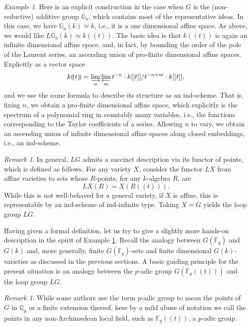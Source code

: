 \documentclass[10pt]{amsart}
\newcommand{\Fq}{\mathbb{F}_q}
\theoremstyle{remark}
\newtheorem{re}[subsubsection]{Remark}
\newtheorem{ex}[subsubsection]{Example}
\numberwithin{equation}{section}
\begin{document}
	\begin{ex}\label{ex:ga} Here is an explicit construction in the case when 
	$G$ is the 
	(non-reductive) additive group $\mathbb{G}_a$, which contains most of the 
	representative ideas. In this case, we have 
	$\mathbb{G}_a(k) \simeq k$, i.e., it is a one dimensional affine space. As above, we 
	would like $L\mathbb{G}_a(k) \simeq k(\!(t)\!)$. The basic idea is that 
	$k(\!(t)\!)$ is again an infinite dimensional affine space, and, in fact, by 
	bounding the order of the pole of the Laurent series, an ascending union of 
	pro-finite dimensional affine spaces. Explicitly as a vector space
	\[
	  k(\!(t)\!) = \varinjlim_n \varprojlim_m t^{-n} \cdot k[[t]] / t^{-n+m} 
	  \cdot k[[t]],
	\]
	and we use the same formula to describe its structure as an ind-scheme. 
	That is, fixing $n$, we obtain a pro-finite dimensional affine space, which 
	explicitly is the spectrum of a polynomial ring in countably many variables, i.e., the functions corresponding to the Taylor coefficients of a series. 
	Allowing $n$ to vary, we obtain an ascending union of infinite dimensional 
	affine spaces along closed embeddings, i.e., an ind-scheme. 
	\end{ex}
	
	\begin{re} In general, $LG$ admits a succinct description via its functor 
	of points, which is defined as 
	follows. For any variety $X$, consider the functor $LX$ from affine 
	varieties to sets whose 
	$R$-points, for any $k$-algebra $R$, are
		\[
		     LX(R) = X(R(\!(t)\!) ).
		\]
	While this is not well-behaved for a general variety, if $X$ is affine, this 
	is representable by an ind-scheme of ind-infinite type. Taking $X = G$ 
	yields the loop group $LG$. 
	\end{re}

	Having given a formal definition, let us try to give a slightly more hands-on description in the spirit of Example \ref{ex:ga}. Recall the analogy 
	between $G(\Fq)$ and $G(k)$ and, more 
	generally, finite $G(\Fq)$-sets and finite dimensional $G(k)$-varieties as 
	discussed in the previous sections. A basic guiding principle for the 
	present situation is an 
	analogy between the $p$-adic group 
	$G(\Fq(\!(t)\!))$ and the loop group $LG$. 
	
\begin{re} While some authors use the term $p$-adic group to mean the points of $G$ in $\mathbb{Q}_p$ or a finite extension thereof, here by a mild abuse of notation we call the points in any non-Archimedean local field, such as $\Fq(\!(t)\!)$, a $p$-adic group. \end{re}	
	
\end{document}
